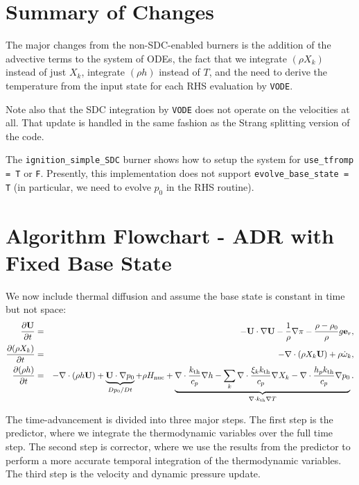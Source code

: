 \section{Summary of Changes}
The major changes from the non-SDC-enabled burners is the addition of
the advective terms to the system of ODEs, the fact that we integrate
$(\rho X_k)$ instead of just $X_k$, integrate $(\rho h)$ instead
of $T$, and the need to derive the
temperature from the input state for each RHS evaluation by {\tt VODE}.

Note also that the SDC integration by {\tt VODE} does not operate on 
the velocities at all.  That update is handled in the same fashion 
as the Strang splitting version of the code.

The {\tt ignition\_simple\_SDC} burner shows how to setup the system
for {\tt use\_tfromp = T} or {\tt F}.  Presently, this implementation
does not support {\tt evolve\_base\_state = T} (in particular, we 
need to evolve $p_0$ in the RHS routine).

\section{Algorithm Flowchart - ADR with Fixed Base State}
We now include thermal diffusion and assume the base state is constant in time but not space:
\begin{eqnarray}
\frac{\partial{\bf U}}{\partial t} &=& 
    -{\bf U}\cdot\nabla{\bf U}  - \frac{1}{\rho}\nabla\pi 
    - \frac{\rho-\rho_0}{\rho} g{\bf e}_r,\\
\frac{\partial(\rho X_k)}{\partial t} &=& 
    -\nabla\cdot(\rho X_k{\bf U}) + \rho\dot{\omega}_k,\label{eq:sdc species}\\
\frac{\partial(\rho h)}{\partial t} &=&
    -\nabla\cdot(\rho h{\bf U}) + \underbrace{{\bf U}\cdot\nabla p_0}_{Dp_0/Dt}
    + \rho{H_{\rm nuc}}
    + \underbrace{\nabla\cdot\frac{k_{\rm th}}{c_p}\nabla h - \sum_k\nabla\cdot\frac{\xi_k k_{\rm th}}{c_p}\nabla X_k - \nabla\cdot\frac{h_p k_{\rm th}}{c_p}\nabla p_0}_{\nabla\cdot k_{\rm th}\nabla T}.\nonumber\\
\label{eq:sdc enthalpy}
\end{eqnarray}

The time-advancement is divided into three major steps.  The first step is the predictor, where we integrate the thermodynamic variables over the full time step.  The second step is corrector, where we use the results from the predictor to perform a more accurate temporal integration of the thermodynamic variables.  The third step is the velocity and dynamic pressure update.

